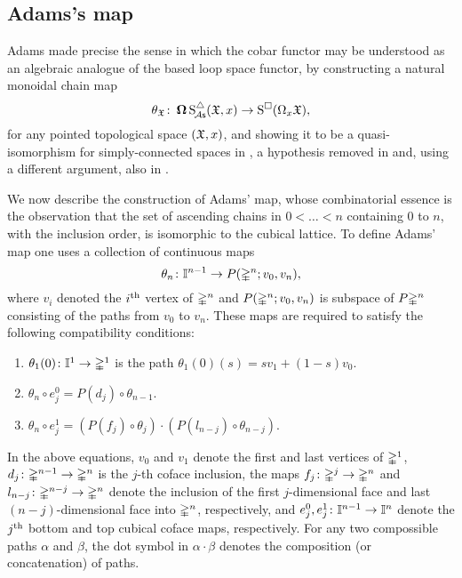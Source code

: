 \subsection{Adams's map}\label{ss:adams maps}

Adams made precise the sense in which the cobar functor may be understood as an algebraic analogue of the based loop space functor, by constructing a natural monoidal chain map
\begin{equation}\label{e:adams map 2}
	\theta_{\mathfrak{X}} \colon \operatorname{\mathbf{\Omega}} \operatorname{S^{\triangle}_{\!{\mathcal{A}\mathsf{s}}}}(\mathfrak{X},x) \to \operatorname{S^{\square}}(\Omega_x \mathfrak{X}),
\end{equation}
for any pointed topological space $(\mathfrak{X},x)$, and showing it to be a quasi-isomorphism for simply-connected spaces in \cite{adams1956cobar}, a hypothesis removed in \cite{rivera2018rigidification} and, using a different argument, also in \cite{rivera2019path}.

We now describe the construction of Adams' map, whose combinatorial essence is the observation that the set of ascending chains in $0 < \dots < n$ containing $0$ to $n$, with the inclusion order, is isomorphic to the cubical lattice.
To define Adams' map one uses a collection of continuous maps
\[
\theta_n \colon \mathbb{I}^{n-1} \to P(\mathbb{\Delta}^n;v_0,v_n),
\]
where $v_i$ denoted the $i^{\mathrm{th}}$ vertex of $\mathbb{\Delta}^n$ and $P(\mathbb{\Delta}^n;v_0,v_n)$ is subspace of $P \mathbb{\Delta}^n$ consisting of the paths from $v_0$ to $v_n$.
These maps are required to satisfy the following compatibility conditions:
\begin{enumerate}
	\item $\theta_1(0)\colon \mathbb{I}^1 \to \mathbb{\Delta}^1$ is the path $\theta_1(0)(s) = sv_1 +(1-s)v_0$.
	\item $\theta_n \circ e_j^0 = P(d_j) \circ \theta_{n-1}$.
	\item $\theta_n \circ e_j^1 = (P(f_j) \circ \theta_j) \cdot (P(l_{n-j}) \circ \theta_{n-j})$.
\end{enumerate}
In the above equations, $v_0$ and $v_1$ denote the first and last vertices of $\mathbb{\Delta}^1$, $d_j \colon \mathbb{\Delta}^{n-1} \to \mathbb{\Delta}^n$ is the $j$-th coface inclusion, the maps $f_j\colon \mathbb{\Delta}^j \rightarrow \mathbb{\Delta}^n$ and $l_{n-j}\colon \mathbb{\Delta}^{n-j} \rightarrow \mathbb{\Delta}^n$ denote the inclusion of the first $j$-dimensional face and last $(n-j)$-dimensional face into $\mathbb{\Delta}^n$, respectively, and
$e_j^0,e_j^1\colon \mathbb{I}^{n-1} \rightarrow \mathbb{I}^{n}$ denote the $j^{\mathrm{th}}$ bottom and top cubical coface maps, respectively.
For any two compossible paths $\alpha$ and $\beta$, the dot symbol in $\alpha \cdot \beta$ denotes the composition (or concatenation) of paths.


